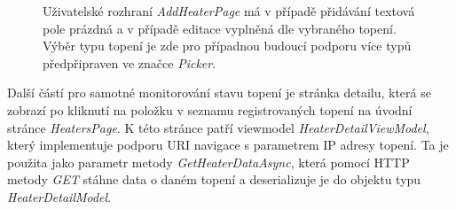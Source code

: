\begin{figure}[hbt]
\centering
{}
\caption{Uživatelské rozhraní {\it AddHeaterPage} má v případě přidávání textová pole prázdná a v případě editace vyplněná dle vybraného topení. Výběr typu topení je zde pro případnou budoucí podporu více typů předpřipraven ve značce {\it Picker}.}
\end{figure}

Další částí pro samotné monitorování stavu topení je stránka detailu, která se zobrazí po kliknutí na položku v seznamu registrovaných topení na úvodní stránce {\it HeatersPage}. K této stránce patří viewmodel {\it HeaterDetailViewModel}, který implementuje podporu URI navigace s parametrem IP adresy topení. Ta je použita jako parametr metody {\it GetHeaterDataAsync}, která pomocí HTTP metody {\it GET} stáhne data o daném topení a deserializuje je do objektu typu {\it HeaterDetailModel}.

